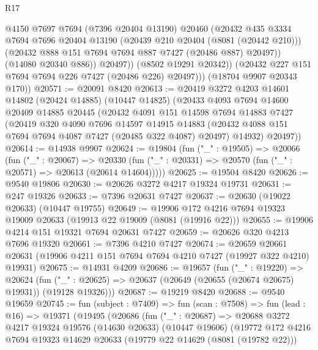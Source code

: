 \begin{lexlean}{R17}
\begin{coremodule}
                  @4150
                  @7697
                  @7694
                  (@7396 @20404 @13190)
                  @20460
                  (@20432
                    @435
                    @3334
                    @7694
                    @7696
                    @20404
                    @13190
                    (@20439 @210 @20404 (@8081 (@20442 @210)))
                    (@20432 @888 @151 @7694 @7694 @887 @7427 (@20486 @887) @20497))
                  (@14080 @20340 @886))
                @20497))
            (@8502 @19291 @20342))
          (@20432 @227 @151 @7694 @7694 @226 @7427 (@20486 @226) @20497)))
      (@18704 @9907 @20343 @170))
@20571 := @20091 @8420
@20613 := @20419
    @3272
    @4203
    @14601
    @14802
    (@20424 @14885)
    (@10447 @14825)
    (@20433
      @4093
      @7694
      @14600
      @20409
      @14885
      @20445
      (@20432
        @4091
        @151
        @14598
        @7694
        @14883
        @7427
        (@20419
          @320
          @4090
          @7696
          @14597
          @14915
          @14883
          (@20432 @4088 @151 @7694 @7694 @4087 @7427 (@20485 @322 @4087) @20497)
          @14932)
        @20497))
@20614 := @14938 @9907
@20624 := @19804
    (fun ("_" : @19505) =>
    @20066
      (fun ("_" : @20067) =>
      @20330 (fun ("_" : @20331) => @20570 (fun ("_" : @20571) => @20613 (@20614 @14604)))))
@20625 := @19504 @8420
@20626 := @9540 @19806
@20630 := @20626 @3272 @4217 @19324 @19731
@20631 := @247 @19326
@20633 := @7396 @20631 @7427
@20637 := @20630 (@19022 @20633) (@10447 @19755)
@20649 := @19906 @172 @4216 @7694 @19323 @19009 @20633 (@19913 @22 @19009 (@8081 (@19916 @22)))
@20655 := @19906 @4214 @151 @19321 @7694 @20631 @7427
@20659 := @20626 @320 @4213 @7696 @19320
@20661 := @7396 @4210 @7427
@20674 := @20659
    @20661
    @20631
    (@19906 @4211 @151 @7694 @7694 @4210 @7427 (@19927 @322 @4210) @19931)
@20675 := @14931 @4209
@20686 := @19657
    (fun ("_" : @19220) =>
    @20624 (fun ("_" : @20625) => @20637 (@20649 (@20655 (@20674 @20675) @19931)) (@19128 @19326)))
@20687 := @19219 @8420
@20688 := @9540 @19659
@20745 := fun (subject : @7409) =>
  fun (scan : @7508) =>
  fun (lead : @16) =>
  @19371
    (@19495
      (@20686
        (fun ("_" : @20687) =>
        @20688
          @3272
          @4217
          @19324
          @19576
          (@14630 @20633)
          (@10447 @19606)
          (@19772
            @172
            @4216
            @7694
            @19323
            @14629
            @20633
            (@19779 @22 @14629 (@8081 (@19782 @22)))

\end{coremodule}
\end{lexlean}
